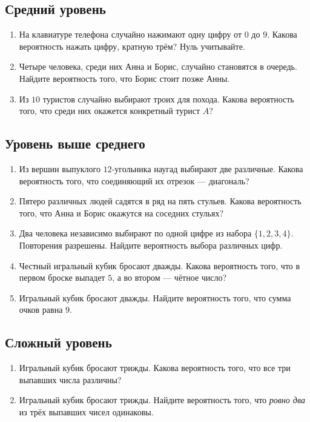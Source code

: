 \documentclass[a4paper,12pt]{article}
\newcommand{\subsect}[1]{\subsection*{\textcolor{darkaccent}{#1}}\vspace{-8pt}}
\begin{document}
\subsect{Средний уровень}
\begin{enumerate}
\item На клавиатуре телефона случайно нажимают одну цифру от $0$ до $9$. Какова вероятность нажать цифру, кратную трём? Нуль учитывайте.
\item Четыре человека, среди них Анна и Борис, случайно становятся в очередь. Найдите вероятность того, что Борис стоит позже Анны.
\item Из $10$ туристов случайно выбирают троих для похода. Какова вероятность того, что среди них окажется конкретный турист $A$?
\end{enumerate}

\subsect{Уровень выше среднего}
\begin{enumerate}[resume]
\item Из вершин выпуклого $12$-угольника наугад выбирают две различные. Какова вероятность того, что соединяющий их отрезок --- диагональ?
\item Пятеро различных людей садятся в ряд на пять стульев. Какова вероятность того, что Анна и Борис окажутся на соседних стульях?
\item Два человека независимо выбирают по одной цифре из набора $\{1,2,3,4\}$. Повторения разрешены. Найдите вероятность выбора различных цифр.
\item Честный игральный кубик бросают дважды. Какова вероятность того, что в первом броске выпадет $5$, а во втором --- чётное число?
\item Игральный кубик бросают дважды. Найдите вероятность того, что сумма очков равна $9$.
\end{enumerate}

\subsect{Сложный уровень}
\begin{enumerate}[resume]
\item Игральный кубик бросают трижды. Какова вероятность того, что все три выпавших числа различны?
\item Игральный кубик бросают трижды. Найдите вероятность того, что \emph{ровно два} из трёх выпавших чисел одинаковы.
\end{enumerate}

\clearpage
\end{document}
